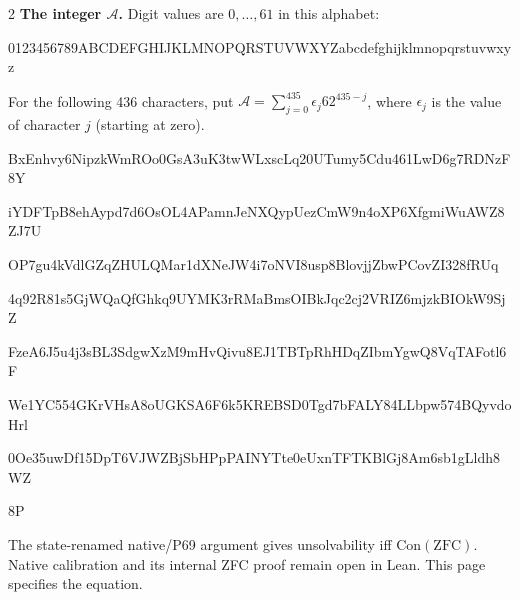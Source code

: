 \documentclass[10pt]{article}
\let\bigsum\sum
\renewcommand{\sum}{\bigsum\nolimits}
\begin{document}
\begin{multicols}{2}
\textbf{The integer $\mathcal A$.} Digit values are $0,\ldots,61$ in this alphabet:
{\fontsize{8}{9.1}\selectfont\ttfamily
0123456789ABCDEFGHIJKLMNOPQRSTUVWXYZabcdefghijklmnopqrstuvwxyz\par}
For the following 436 characters, put
$\mathcal A=\sum_{j=0}^{435}\epsilon_j62^{435-j}$,
where $\epsilon_j$ is the value of character $j$ (starting at zero).

\begingroup
\fontsize{8}{9.1}\selectfont\ttfamily
BxEnhvy6NipzkWmROo0GsA3uK3twWLxscLq20UTumy5Cdu461LwD6g7RDNzF8Y\par
iYDFTpB8ehAypd7d6OsOL4APamnJeNXQypUezCmW9n4oXP6XfgmiWuAWZ8ZJ7U\par
OP7gu4kVdlGZqZHULQMar1dXNeJW4i7oNVI8usp8BlovjjZbwPCovZI328fRUq\par
4q92R81s5GjWQaQfGhkq9UYMK3rRMaBmsOIBkJqc2cj2VRIZ6mjzkBIOkW9SjZ\par
FzeA6J5u4j3sBL3SdgwXzM9mHvQivu8EJ1TBTpRhHDqZIbmYgwQ8VqTAFotl6F\par
We1YC554GKrVHsA8oUGKSA6F6k5KREBSD0Tgd7bFALY84LLbpw574BQyvdoHrl\par
0Oe35uwDf15DpT6VJWZBjSbHPpPAINYTte0eUxnTFTKBlGj8Am6sb1gLldh8WZ\par
8P\par
\endgroup
\medskip
\normalfont\footnotesize
The state-renamed native/P69 argument gives unsolvability iff
$\mathrm{Con}(\mathrm{ZFC})$. Native calibration and its internal ZFC proof
remain open in Lean. This page specifies the equation.
\end{multicols}
\end{document}

